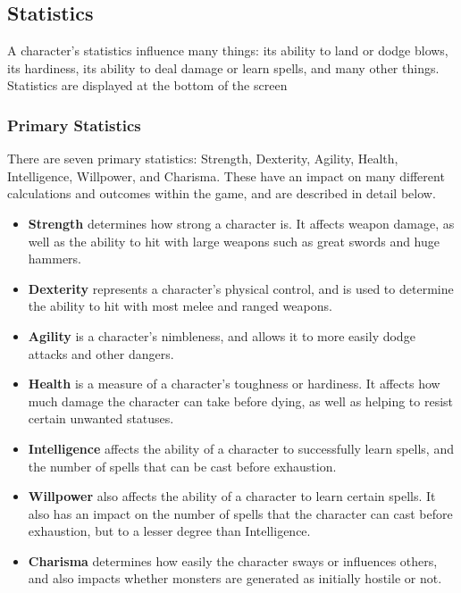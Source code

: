 \documentclass{article}
\begin{document}
\subsection{Statistics}

A character's statistics influence many things: its ability to land or
dodge blows, its hardiness, its ability to deal damage or learn spells,
and many other things.  Statistics are displayed at the bottom of the
screen

\subsubsection{Primary Statistics}

There are seven primary statistics: Strength, Dexterity, Agility, Health,
Intelligence, Willpower, and Charisma.  These have an impact on many
different calculations and outcomes within the game, and are described
in detail below.

\begin{itemize}
\item {\bf Strength} determines how strong a character is.  It affects
weapon damage, as well as the ability to hit with large weapons such as
great swords and huge hammers.

\item {\bf Dexterity} represents a character's physical control, and is
used to determine the ability to hit with most melee and ranged weapons.

\item {\bf Agility} is a character's nimbleness, and allows it to more
easily dodge attacks and other dangers.

\item {\bf Health} is a measure of a character's toughness or hardiness.
It affects how much damage the character can take before dying, as well
as helping to resist certain unwanted statuses.

\item {\bf Intelligence} affects the ability of a character to successfully
learn spells, and the number of spells that can be cast before exhaustion.

\item {\bf Willpower} also affects the ability of a character to learn
certain spells.  It also has an impact on the number of spells that the
character can cast before exhaustion, but to a lesser degree than
Intelligence.

\item {\bf Charisma} determines how easily the character sways or
influences others, and also impacts whether monsters are generated as
initially hostile or not.

\end{itemize}
\end{document}
